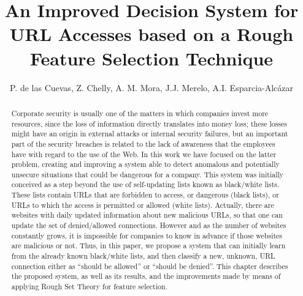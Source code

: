 \documentclass{llncs}
\begin{document}

\title{An Improved Decision System for URL Accesses based on a Rough Feature Selection Technique} 


\author{P. de las Cuevas, Z. Chelly, A. M. Mora, J.J. Merelo, A.I. Esparcia-Alc\'azar}


\maketitle

%
%
\begin{abstract} 
Corporate security is usually one of the matters in which companies
invest more resources, since the loss of information directly translates into
money loss; these losses might have an origin in external attacks or
internal security failures, but an important part of the
security breaches is related to the lack of awareness that the
employees have with regard to the use of the Web. In this work we
have focused on the latter problem, creating and improving a system
able to detect anomalous and potentially unsecure situations that
could be dangerous for a company. This system was initially conceived
as a step beyond the use of self-updating %
lists known as black/white
lists. These lists contain URLs that are forbidden to access, or 
dangerous (black lists), or URLs to which the access is permitted or
allowed (white lists). Actually, there are websites with daily updated
information about new malicious URLs, so that one can update the set
of denied/allowed connections. However and as the number of websites
constantly grows, it is impossible for companies to know in advance if those websites
are malicious or not. Thus, in this paper, we propose a system that
can initially learn from the already known black/white lists, and
then classify a new, unknown, URL connection either as ``should be
allowed'' or ``should be denied''. This chapter describes the proposed
system, as well as its results, and the improvements made by means of
applying Rough Set Theory for feature selection. 
\end{abstract}
\end{document}
